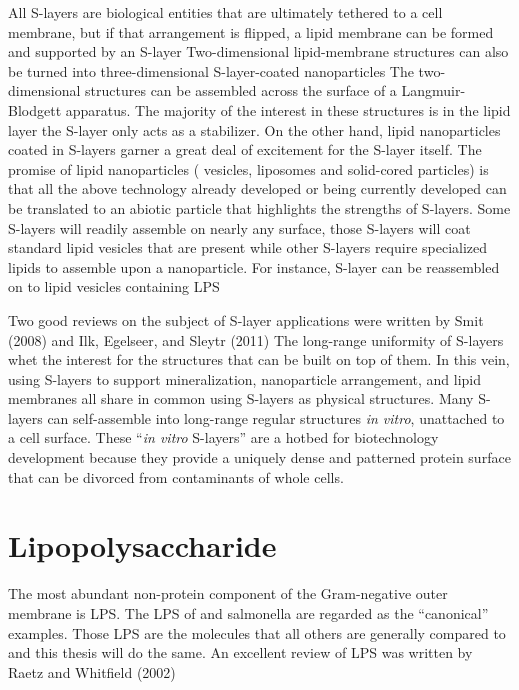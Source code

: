   All \acp{S-layer} are biological entities that are ultimately tethered to a cell membrane, but if that arrangement is flipped, a lipid membrane can be formed and supported by an
\ac{S-layer} Two-dimensional lipid-membrane structures can also be turned into three-dimensional \ac{S-layer}-coated
nanoparticles The two-dimensional structures can be assembled across the surface of a Langmuir-Blodgett apparatus. The majority of the interest in
these structures is in the lipid layer the \ac{S-layer} only acts as a stabilizer. On the other hand, lipid nanoparticles coated in \acp{S-layer} garner a
great deal of excitement for the \ac{S-layer} itself. The promise of lipid nanoparticles (\ie{} vesicles, liposomes and solid-cored particles) is that all the above technology
already developed or being currently developed can be translated to an abiotic particle that highlights the strengths of \acp{S-layer}. Some \acp{S-layer} will readily assemble on
nearly any surface, those \acp{S-layer} will coat standard lipid vesicles that are present while other \acp{S-layer} require specialized lipids to assemble
upon a nanoparticle. For instance, \caulobacter \ac{S-layer} can be reassembled on to lipid vesicles containing \caulobacter{} \ac{LPS}
  
  Two good reviews on the subject of \ac{S-layer} applications were written by Smit (2008) and Ilk, Egelseer, and Sleytr (2011)  The
long-range uniformity of \acp{S-layer} whet the interest for the structures that can be built on top of them. In this vein, using \acp{S-layer} to support mineralization,
nanoparticle arrangement, and lipid membranes all share in common using \acp{S-layer} as physical structures.  Many \acp{S-layer} can self-assemble into long-range regular
structures \textit{in vitro}, unattached to a cell surface. These ``\textit{in vitro} \acp{S-layer}'' are a hotbed for biotechnology development because they provide a uniquely
dense and patterned protein surface that can be divorced from contaminants of whole cells. %

\section{Lipopolysaccharide}\label{sec:intro-lps} %
 The most abundant non-protein component of the Gram-negative
outer membrane is \ac{LPS}. The \ac{LPS} of \ecoli and \acl{salmonella} are regarded as the ``canonical'' examples. Those \ac{LPS} are the molecules that all others are generally
compared to and this thesis will do the same. An excellent review of \ac{LPS} was written by Raetz and Whitfield (2002)

